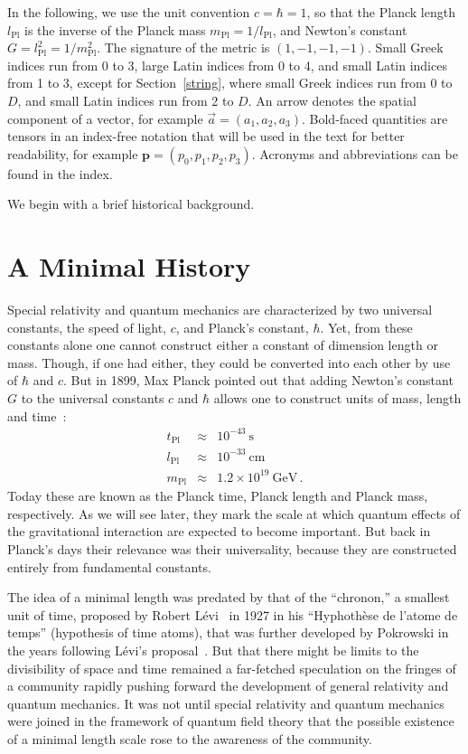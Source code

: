 \documentclass{article}
\def\beqn{\begin{eqnarray}}
\def\eeqn{\end{eqnarray}}
\begin{document}
In the following, we use the unit convention $c=\hbar=1$, so that the
Planck length $l_{\mathrm{Pl}}$ is the inverse of the Planck mass
$m_{\mathrm{Pl}} = 1/ l_{\mathrm{Pl}}$, and Newton's constant $G =
l_{\mathrm{Pl}}^2 = 1/m_{\mathrm{Pl}}^2$. The signature of the metric is
$(1,-1,-1,-1)$. Small Greek indices run from 0 to 3,  large Latin
indices from 0 to 4, and small Latin indices from 1 to 3, except for
Section~\ref{string}, where small Greek indices run from 0 to $D$, and
small Latin indices run from 2 to $D$. An arrow denotes the spatial
component of a vector, for example $\vec a = (a_1, a_2, a_3)$. Bold-faced quantities are tensors in an index-free notation that will be
used in the text for better readability, for example $\mathbf{p} = (p_0,
p_1, p_2, p_3)$. Acronyms and abbreviations can be found in the index.

We begin with a brief historical background.


\newpage

\section{A Minimal History}

Special relativity and quantum mechanics are characterized by two universal
constants, the speed of light, $c$, and  Planck's constant, $\hbar$. Yet, from these
constants alone one cannot construct either a constant of dimension length or mass. Though, if one
had either, they could be converted into each other by use of $\hbar$ and $c$. But in 1899, Max Planck
pointed out that adding Newton's constant $G$ to the universal constants $c$ and $\hbar$ allows
one to construct units of mass, length and time~\cite{Planck}:
\beqn
t_{\mathrm{Pl}} &\approx& 10^{-43}\mathrm{\ s} \nonumber \\
l_{\mathrm{Pl}} &\approx& 10^{-33}\mathrm{\ cm} \nonumber \\
m_{\mathrm{Pl}} &\approx& 1.2 \times 10^{19}\mathrm{\ GeV} \,.
\eeqn
Today these are known as the Planck time, Planck length and Planck mass, respectively. As we will
see later, they mark the scale at which quantum effects of the gravitational interaction are expected
to become important. But back in Planck's days their relevance was their universality,
because they are constructed entirely from fundamental constants. 

The idea of a minimal length was predated by that of the ``chronon,'' a smallest unit of time,
proposed by Robert L\'evi~\cite{Levi} in 1927 in his ``Hyphoth\`ese de l'atome de temps'' (hypothesis of time atoms), 
that was further developed by Pokrowski in the years following  L\'evi's proposal~\cite{Pokrowski}.
But that there might be limits to the divisibility
of space and time remained a far-fetched speculation on the fringes of a community rapidly
pushing forward the development of general relativity and quantum mechanics. It was not until
special relativity and quantum mechanics were joined in the framework of quantum field theory
that the possible existence of a minimal length scale rose to the awareness of the community. 
\end{document}
